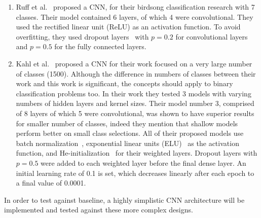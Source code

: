\begin{enumerate}

  \item Ruff et al.~\cite{ruff2020automated} proposed a  CNN, for their birdsong
    classification research with 7 classes. Their model contained
    6 layers, of which 4 were convolutional. They used the rectified linear unit
    (ReLU) as an activation function. To avoid overfitting, they used dropout
    layers~\cite{srivastava2014dropout} with $p=0.2$ for
    convolutional layers and $p=0.5$ for the fully connected layers.

  \item Kahl et al.~\cite{kahl2017large} proposed a CNN for their work focused
    on a very large number of classes (1500). Although the difference in numbers
    of classes between their work and this work is significant, the concepts
    should apply to binary classification problems too. In their work they
    tested 3 models with varying numbers of hidden layers and kernel sizes.
    Their model number 3, comprised of 8 layers of which 5 were convolutional,
    was shown to have superior results for smaller number of classes, indeed
    they mention that shallow models perform better on small class selections.
    All of their proposed models use batch normalization~\cite{ioffe2015batch},
    exponential linear units (ELU)~\cite{clevert2015fast} as the activation
    function, and He-initialization~\cite{he2015delving} for their weighted
    layers. Dropout layers with $p=0.5$ were added to each weighted layer before
    the final dense layer. An initial learning rate of 0.1 is set, which
    decreases linearly after each epoch to a final value of 0.0001.


\end{enumerate}

In order to test against baseline, a highly simplistic CNN architecture will be
implemented and tested against these more complex designs. 

